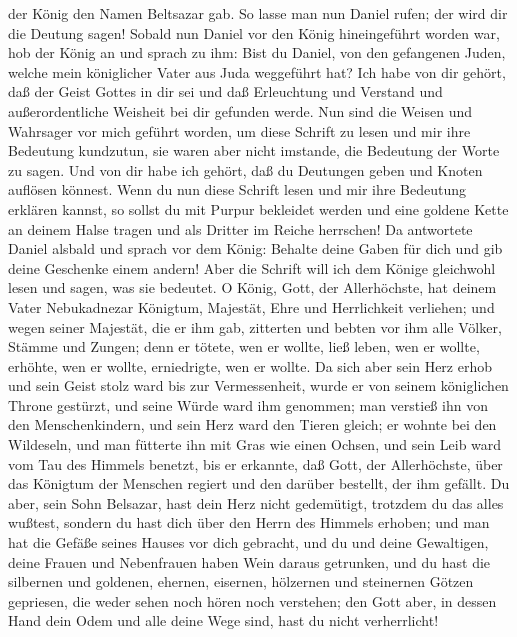 der König den Namen Beltsazar gab. So lasse man nun Daniel rufen; der
wird dir die Deutung sagen!  Sobald nun Daniel vor den
König hineingeführt worden war, hob der König an und sprach zu ihm: Bist
du Daniel, von den gefangenen Juden, welche mein königlicher Vater aus
Juda weggeführt hat?  Ich habe von dir gehört, daß der
Geist Gottes in dir sei und daß Erleuchtung und Verstand und
außerordentliche Weisheit bei dir gefunden werde.  Nun
sind die Weisen und Wahrsager vor mich geführt worden, um diese Schrift
zu lesen und mir ihre Bedeutung kundzutun, sie waren aber nicht
imstande, die Bedeutung der Worte zu sagen.  Und von dir
habe ich gehört, daß du Deutungen geben und Knoten auflösen könnest.
Wenn du nun diese Schrift lesen und mir ihre Bedeutung erklären kannst,
so sollst du mit Purpur bekleidet werden und eine goldene Kette an
deinem Halse tragen und als Dritter im Reiche herrschen! 
Da antwortete Daniel alsbald und sprach vor dem König: Behalte deine
Gaben für dich und gib deine Geschenke einem andern! Aber die Schrift
will ich dem Könige gleichwohl lesen und sagen, was sie bedeutet.
 O König, Gott, der Allerhöchste, hat deinem Vater
Nebukadnezar Königtum, Majestät, Ehre und Herrlichkeit verliehen;
 und wegen seiner Majestät, die er ihm gab, zitterten und
bebten vor ihm alle Völker, Stämme und Zungen; denn er tötete, wen er
wollte, ließ leben, wen er wollte, erhöhte, wen er wollte, erniedrigte,
wen er wollte.  Da sich aber sein Herz erhob und sein
Geist stolz ward bis zur Vermessenheit, wurde er von seinem königlichen
Throne gestürzt, und seine Würde ward ihm genommen;  man
verstieß ihn von den Menschenkindern, und sein Herz ward den Tieren
gleich; er wohnte bei den Wildeseln, und man fütterte ihn mit Gras wie
einen Ochsen, und sein Leib ward vom Tau des Himmels benetzt, bis er
erkannte, daß Gott, der Allerhöchste, über das Königtum der Menschen
regiert und den darüber bestellt, der ihm gefällt.  Du
aber, sein Sohn Belsazar, hast dein Herz nicht gedemütigt, trotzdem du
das alles wußtest,  sondern du hast dich über den Herrn
des Himmels erhoben; und man hat die Gefäße seines Hauses vor dich
gebracht, und du und deine Gewaltigen, deine Frauen und Nebenfrauen
haben Wein daraus getrunken, und du hast die silbernen und goldenen,
ehernen, eisernen, hölzernen und steinernen Götzen gepriesen, die weder
sehen noch hören noch verstehen; den Gott aber, in dessen Hand dein Odem
und alle deine Wege sind, hast du nicht verherrlicht! 
